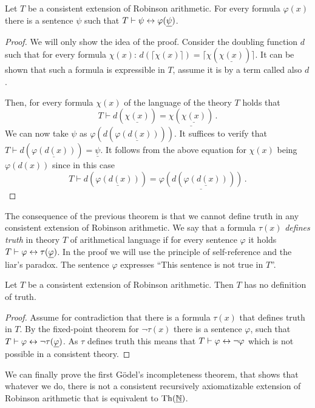 \begin{theorem}
Let $T$ be a consistent extension of Robinson arithmetic. For every formula $\varphi(x)$ there is a sentence $\psi$ such that $T \vdash \psi \leftrightarrow \varphi(\underline{\psi})$.
\end{theorem}
\begin{proof}
We will only show the idea of the proof. Consider the doubling function $d$ such that for every formula $\chi(x)$: $d(\lceil \chi(x) \rceil) = \lceil \chi(\underline{\chi (x)}) \rceil$. It can be shown that such a formula is expressible in $T$, assume it is by a term called also $d$.

Then, for every formula $\chi(x)$ of the language of the theory $T$ holds that $$T \vdash d(\underline{\chi(x)}) = \underline{\chi(\underline{\chi(x)})}\,.$$ We can now take $\psi$ as $\varphi(d(\underline{\varphi(d(x))}))$. It suffices to verify that $T \vdash d(\underline{\varphi(d(x))}) = \underline{\psi}$. It follows from the above equation for $\chi(x)$ being $\varphi(d(x))$ since in this case $$T \vdash d(\underline{\varphi(d(x))}) = \underline{\varphi(d(\underline{\varphi(d(x))}))}\,.$$
\end{proof}

The consequence of the previous theorem is that we cannot define truth in any consistent extension of Robinson arithmetic. We say that a formula $\tau(x)$ \emph{defines truth} in theory $T$ of arithmetical language if for every sentence $\varphi$ it holds $T \vdash \varphi \leftrightarrow \tau(\underline{\varphi})$. In the proof we will use the principle of self-reference and the liar's paradox. The sentence $\varphi$ expresses ``This sentence is not true in $T$''. 

\begin{theorem}
Let $T$ be a consistent extension of Robinson arithmetic. Then $T$ has no definition of truth. 
\end{theorem}
\begin{proof}
Assume for contradiction that there is a formula $\tau(x)$ that defines truth in $T$. By the fixed-point theorem for $\neg \tau(x)$ there is a sentence $\varphi$, such that $T \vdash \varphi \leftrightarrow \neg \tau(\underline{\varphi})$. As $\tau$ defines truth this means that $T \vdash \varphi \leftrightarrow \neg \varphi$ which is not possible in a consistent theory.
\end{proof}

We can finally prove the first Gödel's incompleteness theorem, that shows that whatever we do, there is not a consistent recursively axiomatizable extension of Robinson arithmetic that is equivalent to $\operatorname{Th}(\underline{\mathbb{N}})$.

